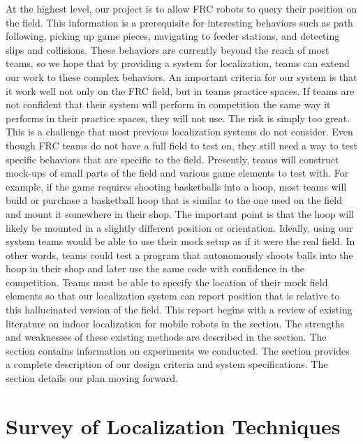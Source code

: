 \documentclass{article}
\begin{document}
	At the highest level, our project is to allow FRC robots to query their position on the field. This information is a prerequisite for interesting behaviors such as path following, picking up game pieces, navigating to feeder stations, and detecting slips and collisions. These behaviors are currently beyond the reach of most teams, so we hope that by providing a system for localization, teams can extend our work to these complex behaviors. An important criteria for our system is that it work well not only on the FRC field, but in teams practice spaces. If teams are not confident that their system will perform in competition the same way it performs in their practice spaces, they will not use. The risk is simply too great. This is a challenge that most previous localization systems do not consider. Even though FRC teams do not have a full field to test on, they still need a way to test specific behaviors that are specific to the field. Presently, teams will construct mock-ups of small parts of the field and various game elements to test with. For example, if the game requires shooting basketballs into a hoop, most teams will build or purchase a basketball hoop that is similar to the one used on the field and mount it somewhere in their shop. The important point is that the hoop will likely be mounted in a slightly different position or orientation. Ideally, using our system teams would be able to use their mock setup as if it were the real field. In other words, teams could test a program that autonomously shoots balls into the hoop in their shop and later use the same code with confidence in the competition. Teams must be able to specify the location of their mock field elements so that our localization system can report position that is relative to this hallucinated version of the field.
	This report begins with a review of existing literature on indoor localization for mobile robots in the  section. The strengths and weaknesses of these existing methods are described in the  section. The  section contains information on experiments we conducted. The  section provides a complete description of our design criteria and system specifications. The  section details our plan moving forward.

\tableofcontents

\section{Survey of Localization Techniques} \label{related_work}
\end{document}

